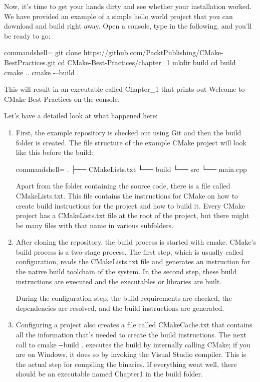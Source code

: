 Now, it's time to get your hands dirty and see whether your installation worked. We have provided an example of a simple hello world project that you can download and build right away. Open a console, type in the following, and you'll be ready to go:

\begin{tcblisting}{commandshell={}}
git clone https://github.com/PacktPublishing/CMake-BestPractices.git
cd CMake-Best-Practices/chapter_1
mkdir build
cd build
cmake ..
cmake -–build .
\end{tcblisting}

This will result in an executable called Chapter\_1 that prints out Welcome to CMake Best Practices on the console.

Let's have a detailed look at what happened here:

\begin{enumerate}
\item 
First, the example repository is checked out using Git and then the build folder is created. The file structure of the example CMake project will look like this before the build:

\begin{tcblisting}{commandshell={}}
.
├── CMakeLists.txt
└── build
└── src
      └── main.cpp
\end{tcblisting}

Apart from the folder containing the source code, there is a file called CMakeLists.txt. This file contains the instructions for CMake on how to create build instructions for the project and how to build it. Every CMake project has a CMakeLists.txt file at the root of the project, but there might be many files with that name in various subfolders.

\item 
After cloning the repository, the build process is started with cmake. CMake's build process is a two-stage process. The first step, which is usually called configuration, reads the CMakeLists.txt file and generates an instruction for the native build toolchain of the system. In the second step, these build instructions are executed and the executables or libraries are built.

During the configuration step, the build requirements are checked, the dependencies are resolved, and the build instructions are generated.

\item 
Configuring a project also creates a file called CMakeCache.txt that contains all the information that's needed to create the build instructions. The next call to cmake -{}-build . executes the build by internally calling CMake; if you are on Windows, it does so by invoking the Visual Studio compiler. This is the actual step for compiling the binaries. If everything went well, there should be an executable named Chapter1 in the build folder.
\end{enumerate}

